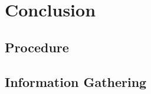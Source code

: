 \documentclass[12pt,a4paper]{article}
\begin{document}
	\section{Conclusion} 
	
	\clearpage
	
	\printbibliography
	\nocite{*}
	
	\clearpage

	\glsaddall
	\printglossaries
	
	\clearpage
	
	\begin{appendices}
	
		\section{Procedure}
		
			\subsection{Information Gathering}
				
					
	\end{appendices}	
	
\end{document}
